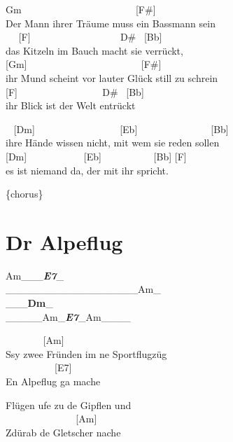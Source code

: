\documentclass[
  letterpaper,
]{scrbook}
\begin{document}
Gm ~ ~ ~ ~ ~ ~ ~ ~ ~ ~ ~ ~ ~ ~{[}F\#{]}\\
Der Mann ihrer Träume muss ein Bassmann sein\\
\hspace*{0.333em} ~ ~{[}F{]} ~ ~ ~ ~ ~ ~ ~ ~ ~ ~ ~D\# ~{[}Bb{]}\\
das Kitzeln im Bauch macht sie verrückt,\\
{[}Gm{]} ~ ~ ~ ~ ~ ~ ~ ~ ~ ~ ~ ~ ~ ~{[}F\#{]}\\
ihr Mund scheint vor lauter Glück still zu schrei\textquotesingle n\\
{[}F{]} ~ ~ ~ ~ ~ ~ ~ ~ ~ ~ D\# ~{[}Bb{]}\\
ihr Blick ist der Welt entrückt

~ {[}Dm{]} ~ ~ ~ ~ ~ ~ ~ ~ ~ ~ {[}Eb{]} ~ ~ ~ ~ ~ ~ ~ ~ ~{[}Bb{]}\\
ihre Hände wissen nicht, mit wem sie reden sollen\\
\hspace*{0.333em} {[}Dm{]} ~ ~ ~ ~ ~ ~ ~{[}Eb{]} ~ ~ ~ ~ ~ ~ {[}Bb{]}
{[}F{]}\\
es ist niemand da, der mit ihr spricht.

\{chorus\}

\hypertarget{dr-alpeflug}{%
\chapter{Dr Alpeflug}\label{dr-alpeflug}}

Am\_\textbf{\emph{\textbar{}}}\_\textbf{\textbar{}}\_\textbf{\emph{\textbar E7}}\_\textbar{}\\
\_\_\_\_\_\_\textbar\_\_\_\_\_\_\textbar\_\_\_\_\_\_\textbar Am\_\textbf{\emph{\textbar{}\\
}}\_\textbf{\textbar{}}\_\textbf{\emph{\textbar{}}}\_\textbf{\textbar Dm}\_\emph{\textbar{}\\
}\_\_\_\_\_\textbar Am\_\textbf{\emph{\textbar E7}}\_\textbar Am\_\_\_\_\textbar{}

~ ~ ~ ~ ~{[}Am{]}\\
S\textquotesingle sy zwee Fründen im ne Sportflugzüg\\
\hspace*{0.333em} ~ ~ ~ ~ ~ ~ {[}E7{]}\\
En Alpeflug ga mache

Flügen ufe zu de Gipflen und\\
\hspace*{0.333em} ~ ~ ~ ~ ~ ~ ~ ~ ~{[}Am{]}\\
Z\textquotesingle dürab de Gletscher nache
\end{document}
